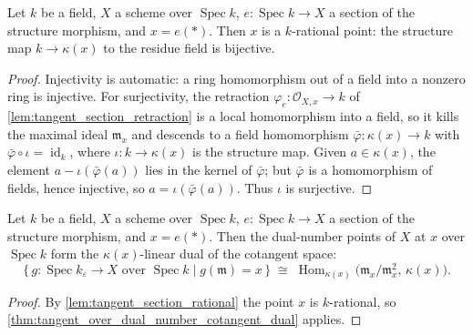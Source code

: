 \begin{lemma}\leanok
  \label{lem:tangent_section_rational}
  Let \(k\) be a field, \(X\) a scheme over \(\operatorname{Spec} k\),
  \(e : \operatorname{Spec} k \to X\) a section of the structure
  morphism, and \(x = e(*)\). Then \(x\) is a \(k\)-rational point:
  the structure map \(k \to \kappa(x)\) to the residue field is
  bijective.
\end{lemma}

\begin{proof}\leanok
  Injectivity is automatic: a ring homomorphism out of a field into a
  nonzero ring is injective. For surjectivity, the retraction
  \(\varphi_e : \mathcal O_{X,x} \to k\) of
  \cref{lem:tangent_section_retraction} is a local homomorphism into
  a field, so it kills the maximal ideal \(\mathfrak m_x\) and
  descends to a field homomorphism
  \(\bar\varphi : \kappa(x) \to k\) with
  \(\bar\varphi \circ \iota = \operatorname{id}_k\), where
  \(\iota : k \to \kappa(x)\) is the structure map. Given
  \(a \in \kappa(x)\), the element
  \(a - \iota(\bar\varphi(a))\) lies in the kernel of
  \(\bar\varphi\); but \(\bar\varphi\) is a homomorphism of fields,
  hence injective, so \(a = \iota(\bar\varphi(a))\). Thus \(\iota\)
  is surjective.
\end{proof}

\begin{corollary}\leanok
  \label{cor:tangent_section_cotangent_dual}
  Let \(k\) be a field, \(X\) a scheme over \(\operatorname{Spec} k\),
  \(e : \operatorname{Spec} k \to X\) a section of the structure
  morphism, and \(x = e(*)\). Then the dual-number points of \(X\) at
  \(x\) over \(\operatorname{Spec} k\) form the \(\kappa(x)\)-linear
  dual of the cotangent space:
  \[
    \{\, g : \operatorname{Spec} k_\varepsilon \to X
        \text{ over } \operatorname{Spec} k
        \mid g(\mathfrak m) = x \,\}
    \;\cong\;
    \operatorname{Hom}_{\kappa(x)}\!\bigl(\mathfrak m_x/\mathfrak m_x^2,\,
      \kappa(x)\bigr).
  \]
\end{corollary}

\begin{proof}\leanok
  By \cref{lem:tangent_section_rational} the point \(x\) is
  \(k\)-rational, so
  \cref{thm:tangent_over_dual_number_cotangent_dual} applies.
\end{proof}

